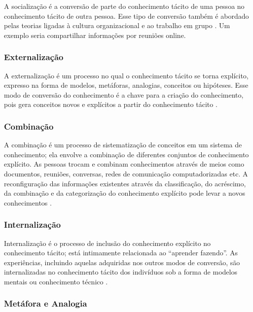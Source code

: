 A socialização é a conversão de parte do conhecimento tácito de uma pessoa no conhecimento tácito de outra pessoa. Esse tipo de conversão também é abordado pelas teorias ligadas à cultura organizacional e ao trabalho em grupo \cite{silva2004gestao}. Um exemplo seria compartilhar informações por reuniões online.

\subsubsection{Externalização}

A externalização é um processo no qual o conhecimento tácito se torna explícito, expresso na forma de modelos, metáforas, analogias, conceitos ou hipóteses. Esse modo de conversão do conhecimento é a chave para a criação do conhecimento, pois gera conceitos novos e explícitos a partir do conhecimento tácito \cite{gavira2003simulaccao}.


\subsubsection{Combinação}

A combinação é um processo de sistematização de conceitos em um sistema de conhecimento; ela envolve a combinação de diferentes conjuntos de conhecimento explícito. As pessoas trocam e combinam conhecimentos através de meios como documentos, reuniões, conversas, redes de comunicação computadorizadas etc. A reconfiguração das informações existentes através da classificação, do acréscimo, da combinação e da categorização do conhecimento explícito pode levar a novos conhecimentos \cite{gavira2003simulaccao}.

\subsubsection{Internalização}

Internalização é o processo de inclusão do conhecimento explícito no 
conhecimento tácito; está intimamente relacionada ao “aprender fazendo”. As experiências, incluindo aquelas adquiridas nos outros modos de conversão, são internalizadas no conhecimento tácito dos indivíduos sob a forma de modelos mentais ou conhecimento técnico \cite{gavira2003simulaccao}.

\subsubsection{Metáfora e Analogia}

